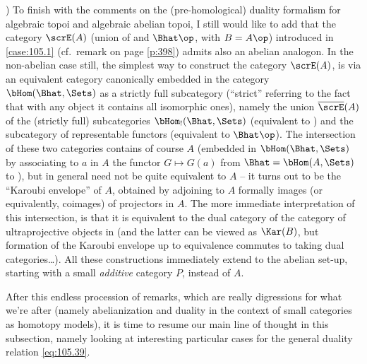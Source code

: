 )%
\enspace To finish with the comments on the (pre-homological)
duality formalism for algebraic topoi and algebraic abelian topoi, I
still would like to add that the category $\scrE(A)$ (union of \Ahat{}
and $\Bhat\op$, with $B=A\op$) introduced in \ref{case:105.1} (cf.\
remark on page \ref{p:398}) admits also an abelian analogon. In the
non-abelian case still, the simplest way to construct the category
$\scrE(A)$, is via an equivalent category canonically embedded in the
category $\bHom(\Bhat,\Sets)$ as a strictly full subcategory
(``strict'' referring to the fact that with any object it contains all
isomorphic ones), namely the union $\overline{\scrE}(A)$ of the
(strictly full) subcategories $\bHom_!(\Bhat,\Sets)$
(equivalent to \Ahat) and the subcategory of representable functors
(equivalent to $\Bhat\op$). The intersection of these two categories
contains of course $A$ (embedded in $\bHom(\Bhat,\Sets)$ by
associating to $a$ in $A$ the functor $G\mapsto G(a)$ from
$\Bhat=\bHom(A,\Sets)$ to \Sets), but in general need not be quite
equivalent to $A$ -- it turns out to be the ``Karoubi envelope'' of
$A$, obtained by adjoining to $A$ formally images (or equivalently,
coimages) of projectors in $A$. The more immediate interpretation of
this intersection, is that it is equivalent to the dual category of
the category of ultraprojective objects in \Bhat{} (and the latter can
be viewed as $\Kar(B)$, but formation of the Karoubi envelope up to
equivalence commutes to taking dual categories\ldots). All these
constructions immediately extend to the abelian set-up, starting with
a small \emph{additive} category $P$, instead of $A$.

After this endless procession of remarks, which are really digressions
for what we're after (namely abelianization and duality in the context
of small categories as homotopy models), it is time to resume our main
line of thought in this subsection, namely looking at interesting
particular cases for the general duality relation \eqref{eq:105.39}.

